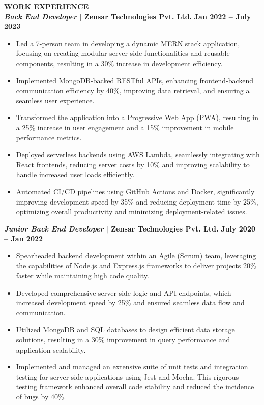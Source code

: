 \documentclass{article}
\begin{document}
\vspace{2mm}


\noindent \textbf{\underline{WORK EXPERIENCE}} \\
\noindent \textbf{\textit{Back End Developer} $\mid$ Zensar Technologies Pvt. Ltd.} \hfill \textbf{Jan 2022 – July 2023}
\begin{itemize}[noitemsep,nolistsep,leftmargin=*]
\item Led a 7-person team in developing a dynamic MERN stack application, focusing on creating modular server-side functionalities and reusable components, resulting in a 30\% increase in development efficiency.
\item Implemented MongoDB-backed RESTful APIs, enhancing frontend-backend communication efficiency by 40\%, improving data retrieval, and ensuring a seamless user experience.
\item Transformed the application into a Progressive Web App (PWA), resulting in a 25\% increase in user engagement and a 15\% improvement in mobile performance metrics.
\item Deployed serverless backends using AWS Lambda, seamlessly integrating with React frontends, reducing server costs by 10\% and improving scalability to handle increased user loads efficiently.
\item Automated CI/CD pipelines using GitHub Actions and Docker, significantly improving development speed by 35\% and reducing deployment time by 25\%, optimizing overall productivity and minimizing deployment-related issues.
\end{itemize}

\vspace{1mm}

\noindent \textbf{\textit{Junior Back End Developer} $\mid$ Zensar Technologies Pvt. Ltd.} \hfill \textbf{July 2020 – Jan 2022}
\begin{itemize}[noitemsep,nolistsep,leftmargin=*]
\item Spearheaded backend development within an Agile (Scrum) team, leveraging the capabilities of Node.js and Express.js frameworks to deliver projects 20\% faster while maintaining high code quality.
\item Developed comprehensive server-side logic and API endpoints, which increased development speed by 25\% and ensured seamless data flow and communication.
\item Utilized MongoDB and SQL databases to design efficient data storage solutions, resulting in a 30\% improvement in query performance and application scalability.
\item Implemented and managed an extensive suite of unit tests and integration testing for server-side applications using Jest and Mocha. This rigorous testing framework enhanced overall code stability and reduced the incidence of bugs by 40\%.
\end{itemize}
\end{document}
